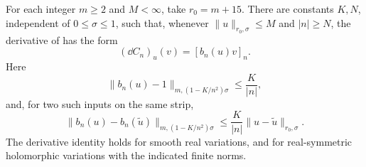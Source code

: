 \begin{proposition}\label{prop:high-frequency-estimate}
For each integer \(m\ge2\) and \(M<\infty\), take \(r_0=m+15\).
There are constants \(K,N\), independent of \(0\le\sigma\le1\),
such that, whenever \(\|u\|_{r_0,\sigma}\le M\) and \(|n|\ge N\),
the derivative of  has the form
\begin{equation}\label{ana:constraint-derivative}
(\dd C_n)_u(v)=[b_n(u)v]_n.
\end{equation}
Here
\begin{equation}\label{ana:coefficient-estimate}
\|b_n(u)-1\|_{m,(1-K/n^2)\sigma}\le\frac{K}{|n|},
\end{equation}
and, for two such inputs on the same strip,
\begin{equation}\label{ana:coefficient-lipschitz}
\|b_n(u)-b_n(\widetilde u)\|_{m,(1-K/n^2)\sigma}
\le\frac{K}{|n|}\|u-\widetilde u\|_{r_0,\sigma}.
\end{equation}
The derivative identity holds for smooth real variations, and for
real-symmetric holomorphic variations with the indicated finite norms.
\end{proposition}

